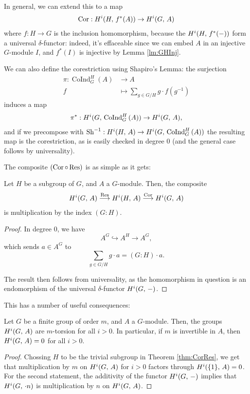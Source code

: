 \documentclass[a4paper, oneside]{memoir}
\begin{document}
\noindent In general, we can extend this to a map
\[
	\operatorname{Cor}: H^{i}( H, \, f^*(A) )\to H^{i}( G, \, A )
\]
where $f: H\to G$ is the inclusion homomorphism, because the $H^{i}( H, \, f^*(-) )$ form a universal $\delta$-functor: indeed, it's effaceable since we can embed $A$ in an injective $G$-module $I$, and $f^*(I)$ is injective by Lemma \ref{lm:GHInj}.

\begin{remark}\label{rm:Cor}
	We can also define the corestriction using Shapiro's Lemma: the surjection
	\begin{align*}
		\pi: \operatorname{CoInd}_G^H{(A)} & \to A                                      \\
		f                                  & \mapsto \sum_{g\in G /H}{g\cdot f(g^{-1})}
	\end{align*}
	induces a map
	\[
		\pi^*:H^{i}( G, \, \operatorname{CoInd}_G^H{(A)} )\to H^{i}( G, \, A ),
	\]
	and if we precompose with $\operatorname{Sh}^{-1}: H^{i}( H, \, A )\to H^{i}( G, \, \operatorname{CoInd}_G^H{(A)} )$ the resulting map is the corestriction, as is easily checked in degree $0$ (and the general case follows by universality).
\end{remark}

The composite $(\operatorname{Cor}\circ\operatorname{Res})$ is as simple as it gets:

\begin{theorem}\label{thm:CorRes}
	Let $H$ be a subgroup of $G$, and $A$ a $G$-module. Then,  the composite
	\[
		H^{i}( G, \, A )\overset{\operatorname{Res}}{\longrightarrow}H^{i}( H, \, A )\overset{\operatorname{Cor}}{\longrightarrow}H^{i}( G, \, A )
	\]
	is multiplication by the index $(G:H)$.
\end{theorem}
\begin{proof}
	In degree $0$, we have
	\[
		A^G\hookrightarrow A^H\to A^G,
	\]
	which sends $a\in A^G$ to \[\sum_{g\in G/H} g\cdot a = (G:H)\cdot a.\]

	The result then follows from universality, as the homomorphism in question is an endomorphism of the universal $\delta$-functor $H^{i}( G, \, - )$.
\end{proof}

This has a number of useful consequences:
\begin{corollary}
	Let $G$ be a finite group of order $m$, and $A$ a $G$-module. Then, the groups $H^{i}( G, \, A )$ are $m$-torsion for all $i>0$. In particular, if $m$ is invertible in $A$, then $H^{i}( G, \, A )=0$ for all $i>0$.
\end{corollary}
\begin{proof}
	Chossing $H$ to be the trivial subgroup in Theorem \ref{thm:CorRes}, we get that multiplication by $m$ on $H^{i}( G, \, A )$ for $i>0$ factors through $H^{i}( \{1\}, \, A )=0$. For the second statement, the additivity of the functor $H^{i}( G, \, - )$ implies that $H^{i}( G, \, \cdot n )$ is multiplication by $n$ on $H^{i}( G, \, A )$.
\end{proof}
\end{document}
